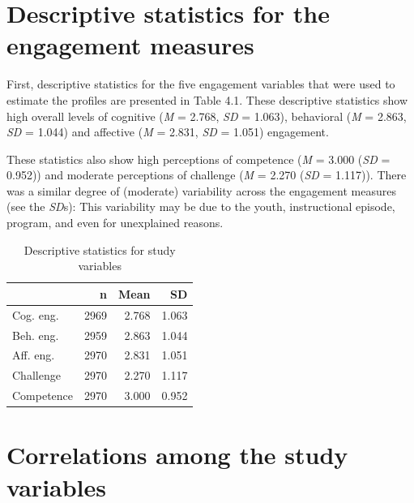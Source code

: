 \documentclass[]{book}
\theoremstyle{definition}
\theoremstyle{definition}
\theoremstyle{definition}
\theoremstyle{remark}
\begin{document}
\section{Descriptive statistics for the engagement
measures}\label{descriptive-statistics-for-the-engagement-measures}

First, descriptive statistics for the five engagement variables that
were used to estimate the profiles are presented in Table 4.1. These
descriptive statistics show high overall levels of cognitive (\emph{M} =
2.768, \emph{SD} = 1.063), behavioral (\emph{M} = 2.863, \emph{SD} =
1.044) and affective (\emph{M} = 2.831, \emph{SD} = 1.051) engagement.

These statistics also show high perceptions of competence (\emph{M} =
3.000 (\emph{SD} = 0.952)) and moderate perceptions of challenge
(\emph{M} = 2.270 (\emph{SD} = 1.117)). There was a similar degree of
(moderate) variability across the engagement measures (see the
\emph{SD}s): This variability may be due to the youth, instructional
episode, program, and even for unexplained reasons.

\begin{table}

\caption{\label{tab:unnamed-chunk-7}Descriptive statistics for study variables}
\centering
\begin{tabular}[t]{lrrr}
\toprule
 & n & Mean & SD\\
\midrule
Cog. eng. & 2969 & 2.768 & 1.063\\
Beh. eng. & 2959 & 2.863 & 1.044\\
Aff. eng. & 2970 & 2.831 & 1.051\\
Challenge & 2970 & 2.270 & 1.117\\
Competence & 2970 & 3.000 & 0.952\\
\bottomrule
\end{tabular}
\end{table}

\section{Correlations among the study
variables}\label{correlations-among-the-study-variables}
\end{document}
